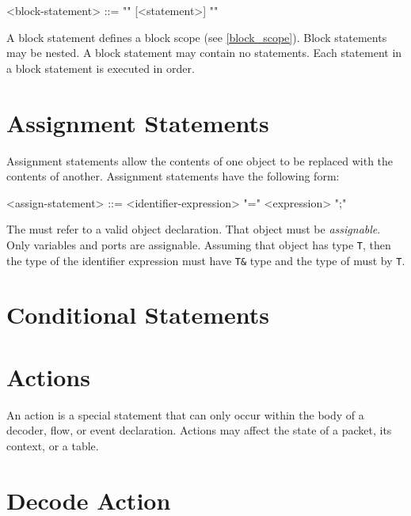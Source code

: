 \begin{minip}
\begin{grammar}
<block-statement> ::=
"{" [<statement>] "}"
\end{grammar}
\end{minip}

A block statement defines a block scope (see \ref{block_scope}). Block statements may be nested. A block statement may contain no statements. Each statement in a block statement is executed in order.

\section{Assignment Statements} \label{assign_stmt_guide}

Assignment statements allow the contents of one object to be replaced with the contents of another. Assignment statements have the following form:

\begin{minip}
\begin{grammar}
<assign-statement> ::=
<identifier-expression> "=" <expression> ";"
\end{grammar}
\end{minip}

The  must refer to a valid object declaration. That object must be \textit{assignable}. Only variables and ports are assignable. Assuming that object has type \texttt{T}, then the type of the identifier expression must have \texttt{T&} type and the type of  must by \texttt{T}.

\section{Conditional Statements} \label{condition_guide}


\section{Actions} \label{action_guide}

An action is a special statement that can only occur within the body of a decoder, flow, or event declaration. Actions may affect the state of a packet, its context, or a table. 

\section{Decode Action} \label{decode_guide}

